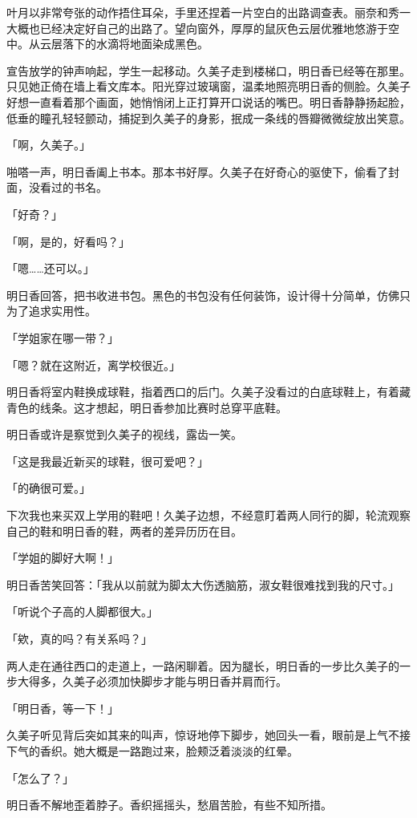 \documentclass[UTF8]{ctexart}
\begin{document}
    叶月以非常夸张的动作捂住耳朵，手里还捏着一片空白的出路调查表。丽奈和秀一大概也已经决定好自己的出路了。望向窗外，厚厚的鼠灰色云层优雅地悠游于空中。从云层落下的水滴将地面染成黑色。 

    宣告放学的钟声响起，学生一起移动。久美子走到楼梯口，明日香已经等在那里。只见她正倚在墙上看文库本。阳光穿过玻璃窗，温柔地照亮明日香的侧脸。久美子好想一直看着那个画面，她悄悄闭上正打算开口说话的嘴巴。明日香静静扬起脸，低垂的瞳孔轻轻颤动，捕捉到久美子的身影，抿成一条线的唇瓣微微绽放出笑意。 

    「啊，久美子。」 

    啪嗒一声，明日香阖上书本。那本书好厚。久美子在好奇心的驱使下，偷看了封面，没看过的书名。 

    「好奇？」 

    「啊，是的，好看吗？」 

    「嗯……还可以。」 

    明日香回答，把书收进书包。黑色的书包没有任何装饰，设计得十分简单，仿佛只为了追求实用性。 

    「学姐家在哪一带？」 

    「嗯？就在这附近，离学校很近。」 

    明日香将室内鞋换成球鞋，指着西口的后门。久美子没看过的白底球鞋上，有着藏青色的线条。这才想起，明日香参加比赛时总穿平底鞋。 

    明日香或许是察觉到久美子的视线，露齿一笑。 

    「这是我最近新买的球鞋，很可爱吧？」 

    「的确很可爱。」 

    下次我也来买双上学用的鞋吧！久美子边想，不经意盯着两人同行的脚，轮流观察自己的鞋和明日香的鞋，两者的差异历历在目。 

    「学姐的脚好大啊！」 

    明日香苦笑回答：「我从以前就为脚太大伤透脑筋，淑女鞋很难找到我的尺寸。」 

    「听说个子高的人脚都很大。」 

    「欸，真的吗？有关系吗？」 

    两人走在通往西口的走道上，一路闲聊着。因为腿长，明日香的一步比久美子的一步大得多，久美子必须加快脚步才能与明日香并肩而行。 

    「明日香，等一下！」 

    久美子听见背后突如其来的叫声，惊讶地停下脚步，她回头一看，眼前是上气不接下气的香织。她大概是一路跑过来，脸颊泛着淡淡的红晕。 

    「怎么了？」 

    明日香不解地歪着脖子。香织摇摇头，愁眉苦脸，有些不知所措。 
\end{document}
